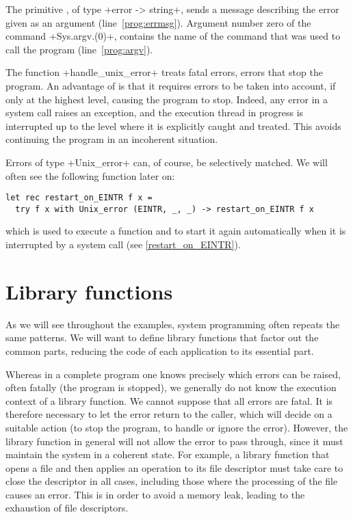The primitive , of type 
\ml+error -> string+, sends a message describing the error given as an argument
(line~\ref{prog:errmsg}). Argument number zero of the command
\ml+Sys.argv.(0)+, contains the name of the command that was used to
call the program (line~\ref{prog:argv}).

The function \ml+handle_unix_error+ treats fatal errors, \ie{} errors
that stop the program.  An advantage of {\ocaml} is that it requires
errors to be taken into account, if only at the highest level, causing
the program to stop. Indeed, any error in a system call raises an
exception, and the execution thread in progress is interrupted up to the
level where it is explicitly caught and treated. This avoids
continuing the program in an incoherent situation.


Errors of type \ml+Unix_error+  can, of course, be
selectively matched. We will often see the following
function later on:
%
\begin{lstlisting}
let rec restart_on_EINTR f x = 
  try f x with Unix_error (EINTR, _, _) -> restart_on_EINTR f x 
\end{lstlisting}
%

which is used to execute a function and to start it again automatically
when it is interrupted by a system call (see \ref{restart_on_EINTR}).



\section{Library functions}

As we will see throughout the examples, system programming often
repeats the same patterns. We will want to define library functions
that factor out the common parts, reducing the code of each
application to its essential part.


Whereas in a complete program one knows precisely which errors can be
raised, often fatally (the program is stopped), we generally do not
know the execution context of a library function. We cannot suppose
that all errors are fatal. It is therefore necessary to let the error
return to the caller, which will decide on a suitable action (to stop
the program, to handle or ignore the error). However, the library
function in general will not allow the error to pass through, since it
must maintain the system in a coherent state. For example, a library
function that opens a file and then applies an operation to its file
descriptor must take care to close the descriptor in all cases,
including those where the processing of the file causes an error. This
is in order to avoid a memory leak, leading to the exhaustion of file
descriptors.





